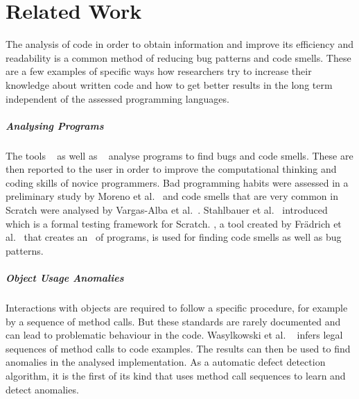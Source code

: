 \chapter{Related Work}\label{sec:related-work}
The analysis of code in order to obtain information and improve its efficiency and readability is a common method of reducing bug patterns and code smells. These are a few examples of specific ways how researchers try to increase their knowledge about written code and how to get better results in the long term independent of the assessed programming languages.

\paragraph{Analysing \scratch{} Programs}
The tools \drscratch{}~\cite{drscratch} as well as \hairball{}~\cite{hairball} analyse \scratch{} programs to find bugs and code smells. These are then reported to the user in order to improve the computational thinking and coding skills of novice programmers. Bad programming habits were assessed in a preliminary study by Moreno et al.~\cite{badhabits} and code smells that are very common in Scratch were analysed by Vargas-Alba et al.~\cite{badsmells}. Stahlbauer et al.~\cite{whisker} introduced \whisker{} which is a formal testing framework for Scratch. \litterbox, a tool created by Frädrich et al.~\cite{scratch_bugpatterns} that creates an \AST\ of \scratch{} programs, is used for finding code smells as well as bug patterns.

\paragraph{Object Usage Anomalies}
Interactions with objects are required to follow a specific procedure, for example by a sequence of method calls. But these standards are rarely documented and can lead to problematic behaviour in the code. Wasylkowski et al. ~\cite{object_usage} infers legal sequences of method calls to code examples. The results can then be used to find anomalies in the analysed implementation. As a automatic defect detection algorithm, it is the first of its kind that uses method call sequences to learn and detect anomalies.

